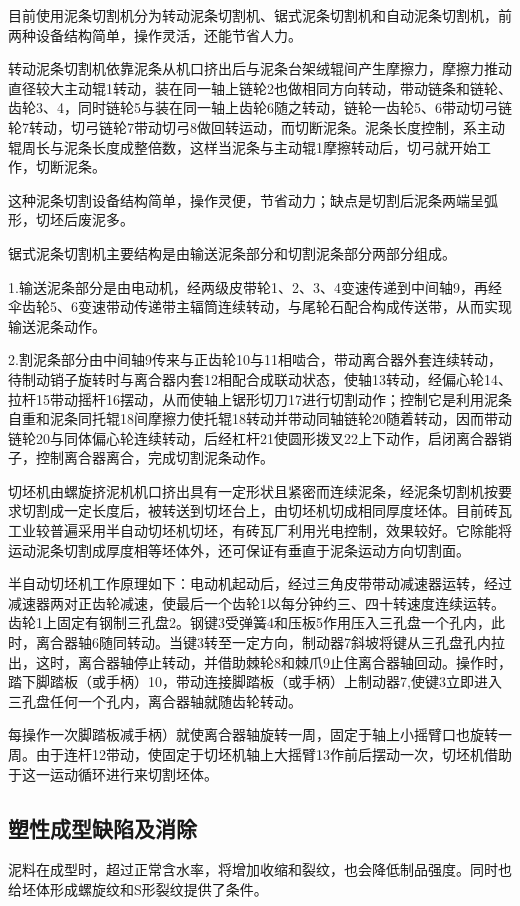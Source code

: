 \documentclass{ctexbook}
\begin{document}
目前使用泥条切割机分为转动泥条切割机、锯式泥条切割机和自动泥条切割机，前两种设备结构简单，操作灵活，还能节省人力。

转动泥条切割机依靠泥条从机口挤出后与泥条台架绒辊间产生摩擦力，摩擦力推动直径较大主动辊1转动，装在同一轴上链轮2也做相同方向转动，带动链条和链轮、齿轮3、4，同时链轮5与装在同一轴上齿轮6随之转动，链轮一齿轮5、6带动切弓链轮7转动，切弓链轮7带动切弓8做回转运动，而切断泥条。泥条长度控制，系主动辊周长与泥条长度成整倍数，这样当泥条与主动辊1摩擦转动后，切弓就开始工作，切断泥条。

这种泥条切割设备结构简单，操作灵便，节省动力；缺点是切割后泥条两端呈弧形，切坯后废泥多。

锯式泥条切割机主要结构是由输送泥条部分和切割泥条部分两部分组成。

1.输送泥条部分是由电动机，经两级皮带轮1、2、3、4变速传递到中间轴9，再经伞齿轮5、6变速带动传递带主辐筒连续转动，与尾轮石配合构成传送带，从而实现输送泥条动作。

2.割泥条部分由中间轴9传来与正齿轮10与11相啮合，带动离合器外套连续转动，待制动销子旋转时与离合器内套12相配合成联动状态，使轴13转动，经偏心轮14、拉杆15带动摇杆16摆动，从而使轴上锯形切刀17进行切割动作；控制它是利用泥条自重和泥条同托辊18间摩擦力使托辊18转动并带动同轴链轮20随着转动，因而带动链轮20与同体偏心轮连续转动，后经杠杆21使圆形拨叉22上下动作，启闭离合器销子，控制离合器离合，完成切割泥条动作。

切坯机由螺旋挤泥机机口挤出具有一定形状且紧密而连续泥条，经泥条切割机按要求切割成一定长度后，被转送到切坯台上，由切坯机切成相同厚度坯体。目前砖瓦工业较普遍采用半自动切坯机切坯，有砖瓦厂利用光电控制，效果较好。它除能将运动泥条切割成厚度相等坯体外，还可保证有垂直于泥条运动方向切割面。

半自动切坯机工作原理如下：电动机起动后，经过三角皮带带动减速器运转，经过减速器两对正齿轮减速，使最后一个齿轮1以每分钟约三、四十转速度连续运转。齿轮1上固定有钢制三孔盘2。钢键3受弹簧4和压板5作用压入三孔盘一个孔内，此时，离合器轴6随同转动。当键3转至一定方向，制动器7斜坡将键从三孔盘孔内拉出，这时，离合器轴停止转动，并借助棘轮8和棘爪9止住离合器轴回动。操作时，踏下脚踏板（或手柄）10，带动连接脚踏板（或手柄）上制动器7,使键3立即进入三孔盘任何一个孔内，离合器轴就随齿轮转动。

每操作一次脚踏板减手柄）就使离合器轴旋转一周，固定于轴上小摇臂口也旋转一周。由于连杆12带动，使固定于切坯机轴上大摇臂13作前后摆动一次，切坯机借助于这一运动循环进行来切割坯体。
\subsection{塑性成型缺陷及消除}
泥料在成型时，超过正常含水率，将增加收缩和裂纹，也会降低制品强度。同时也给坯体形成螺旋纹和S形裂纹提供了条件。
\end{document}
